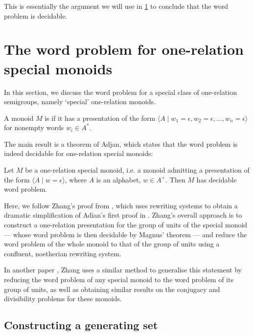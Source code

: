 \documentclass[noindex,noinsetproof,emphthm,12pt]{lmaths}
\begin{document}
This is essentially the argument we will use in \cref{sec:special-monoids} to conclude that the word problem is decidable.

\section{The word problem for one-relation special monoids} \label{sec:special-monoids}

In this section, we discuss the word problem for a special class of one-relation semigroups, namely `special' one-relation monoids.

\begin{defn} \label{def:special}
	A monoid $M$ is  if it has a presentation of the form $\langle A \mid w_1 = \epsilon, w_2 = \epsilon, \ldots, w_n = \epsilon \rangle$ for nonempty words $w_i \in A^*$.
\end{defn}

The main result is a theorem of Adjan, which states that the word problem is indeed decidable for one-relation special monoids:

\begin{theorem}[Adjan] \label{thm:ors-decidablewp}
	Let $M$ be a one-relation special monoid, i.e. a monoid admitting a presentation of the form $\langle A \mid w = \epsilon\rangle$, where $A$ is an alphabet, $w \in A^+$. Then $M$ has decidable word problem.
\end{theorem}

Here, we follow Zhang's proof from \cite{Zhang1992a}, which uses rewriting systems to obtain a dramatic simplification of Adian's first proof in \cite{Adian1966}. Zhang's overall approach is to construct a one-relation presentation for the group of units of the special monoid --- whose word problem is then decidable by Magnus' theorem --- and reduce the word problem of the whole monoid to that of the group of units using a confluent, noetherian rewriting system.

In another paper \cite{Zhang1992}, Zhang uses a similar method to generalise this statement by reducing the word problem of any special monoid to the word problem of its group of units, as well as obtaining similar results on the conjugacy and divisibility problems for these monoids.


\subsection{Constructing a generating set} \label{sec:constructing-genset}
\end{document}

